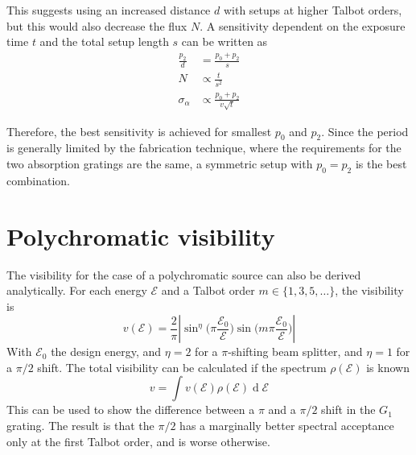 \documentclass[a0,portrait]{a0poster}
\newcommand{\G}[1]{\ensuremath{G_{#1}}}
\newcommand{\energy}{\ensuremath{\mathcal{E}}}
\newcommand{\de}[1]{\ensuremath{\operatorname{d}\!{#1}}}
\begin{document}
\begin{multicols}{2}
This suggests using an increased distance $d$ with setups at higher Talbot
orders, but this would also decrease the flux $N$. A sensitivity dependent
on the exposure time $t$ and the total setup length $s$ can be written as
\begin{align*}
    \frac{p_2}{d} &= \frac{p_0 + p_2}{s}\\
    N &\propto \frac{t}{s^2}\\
    \sigma_\alpha &\propto \frac{p_0 + p_2}{v\sqrt{t}}
\end{align*}

Therefore, the best sensitivity is achieved for smallest $p_0$ and
$p_2$. Since the period is generally limited by the fabrication technique,
where
the requirements for the two absorption gratings are the same, a
symmetric setup with $p_0 = p_2$ is the best combination.

\section*{Polychromatic visibility}
The visibility for the case of a polychromatic source can also be derived
analytically\cite{Thuering2014}. For each energy $\energy$ and a Talbot order $m \in
\{1,3,5,\ldots\}$, the visibility is
\begin{equation*}
    v(\energy) = \frac{2}{\pi} \left \lvert \sin^\eta \Big( \pi
    \frac{\energy_0}{\energy} \Big) \sin \Big( m \pi
    \frac{\energy_0}{\energy} \Big) \right \rvert
\end{equation*}
With $\energy_0$ the design energy, and $\eta = 2$ for a $\pi$-shifting beam splitter, and $\eta=1$ for a
$\pi / 2$ shift.
The total visibility can be calculated if the spectrum $\rho(\energy)$ is
known
\begin{equation*}
    v = \int v(\energy) \rho(\energy) \de \energy
\end{equation*}
This can be used to show the difference between a $\pi$ and a $\pi / 2$
shift in the \G{1} grating. The result is that the $\pi / 2$ has a
marginally better spectral acceptance only at the first Talbot order, and is
worse otherwise.


\end{multicols}
\end{document}
